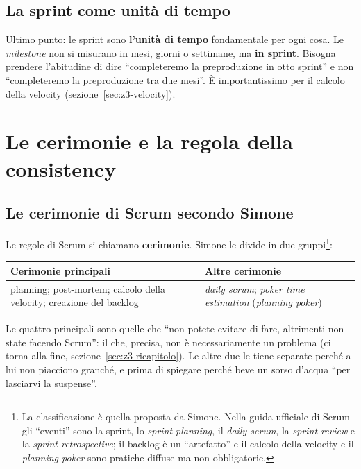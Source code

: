 \subsection{La sprint come unità di tempo}

Ultimo punto: le sprint sono \textbf{l'unità di tempo} fondamentale per ogni
cosa. Le \emph{milestone} non si misurano in mesi, giorni o settimane, ma
\textbf{in sprint}. Bisogna prendere l'abitudine di dire ``completeremo la
preproduzione in otto sprint'' e non ``completeremo la preproduzione tra due
mesi''. È importantissimo per il calcolo della velocity
(sezione~\ref{sec:z3-velocity}).

\section{Le cerimonie e la regola della consistency}
\label{sec:z3-cerimonie}

\subsection{Le cerimonie di Scrum secondo Simone}

Le regole di Scrum si chiamano \textbf{cerimonie}. Simone le divide in due
gruppi\footnote{La classificazione è quella proposta da Simone. Nella guida
ufficiale di Scrum gli ``eventi'' sono la sprint, lo \emph{sprint planning},
il \emph{daily scrum}, la \emph{sprint review} e la \emph{sprint
retrospective}; il backlog è un ``artefatto'' e il calcolo della velocity
e il \emph{planning poker} sono pratiche diffuse ma non obbligatorie.}:
\begin{center}
  \begin{tabular}{@{}p{}p{}@{}}
    \toprule
    \textbf{Cerimonie principali} & \textbf{Altre cerimonie} \\
    \midrule
    planning; post-mortem; calcolo della velocity; creazione del backlog &
    \emph{daily scrum}; \emph{poker time estimation} (\emph{planning poker})\\
    \bottomrule
  \end{tabular}
\end{center}
Le quattro principali sono quelle che ``non potete evitare di fare,
altrimenti non state facendo Scrum'': il che, precisa, non è necessariamente
un problema (ci torna alla fine, sezione~\ref{sec:z3-ricapitolo}). Le altre
due le tiene separate perché a lui non piacciono granché, e prima di spiegare
perché beve un sorso d'acqua ``per lasciarvi la suspense''.

